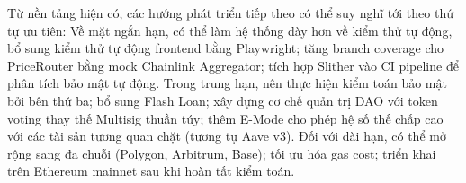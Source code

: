 \documentclass[../DoAn.tex]{subfiles}
\begin{document}
Từ nền tảng hiện có, các hướng phát triển tiếp theo có thể suy nghĩ tới theo thứ tự ưu tiên: Về mặt ngắn hạn, có thể làm hệ thống dày hơn về kiểm thử tự động, bổ sung kiểm thử tự động frontend bằng Playwright; tăng branch coverage cho PriceRouter bằng mock Chainlink Aggregator; tích hợp Slither vào CI pipeline để phân tích bảo mật tự động. Trong trung hạn, nên thực hiện kiểm toán bảo mật bởi bên thứ ba; bổ sung Flash Loan; xây dựng cơ chế quản trị DAO với token voting thay thế Multisig thuần túy; thêm E-Mode cho phép hệ số thế chấp cao với các tài sản tương quan chặt (tương tự Aave v3). Đối với dài hạn, có thể mở rộng sang đa chuỗi (Polygon, Arbitrum, Base); tối ưu hóa gas cost; triển khai trên Ethereum mainnet sau khi hoàn tất kiểm toán.
\end{document}
